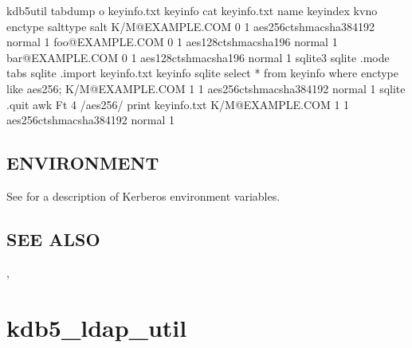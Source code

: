 \documentclass[letterpaper,10pt,english]{sphinxmanual}
\begin{document}
\begin{sphinxVerbatim}[commandchars=\\\{\}]
\PYGZdl{} kdb5\PYGZus{}util tabdump \PYGZhy{}o keyinfo.txt keyinfo
\PYGZdl{} cat keyinfo.txt
name        keyindex        kvno    enctype salttype        salt
K/M@EXAMPLE.COM     0       1       aes256\PYGZhy{}cts\PYGZhy{}hmac\PYGZhy{}sha384\PYGZhy{}192      normal  \PYGZhy{}1
foo@EXAMPLE.COM     0       1       aes128\PYGZhy{}cts\PYGZhy{}hmac\PYGZhy{}sha1\PYGZhy{}96 normal  \PYGZhy{}1
bar@EXAMPLE.COM     0       1       aes128\PYGZhy{}cts\PYGZhy{}hmac\PYGZhy{}sha1\PYGZhy{}96 normal  \PYGZhy{}1
\PYGZdl{} sqlite3
sqlite\PYGZgt{} .mode tabs
sqlite\PYGZgt{} .import keyinfo.txt keyinfo
sqlite\PYGZgt{} select * from keyinfo where enctype like \PYGZsq{}aes256\PYGZhy{}\PYGZpc{}\PYGZsq{};
K/M@EXAMPLE.COM     1       1       aes256\PYGZhy{}cts\PYGZhy{}hmac\PYGZhy{}sha384\PYGZhy{}192      normal  \PYGZhy{}1
sqlite\PYGZgt{} .quit
\PYGZdl{} awk \PYGZhy{}F\PYGZsq{}\PYGZbs{}t\PYGZsq{} \PYGZsq{}\PYGZdl{}4 \PYGZti{} /aes256\PYGZhy{}/ \PYGZob{} print \PYGZcb{}\PYGZsq{} keyinfo.txt
K/M@EXAMPLE.COM     1       1       aes256\PYGZhy{}cts\PYGZhy{}hmac\PYGZhy{}sha384\PYGZhy{}192      normal  \PYGZhy{}1
\end{sphinxVerbatim}


\subsection{ENVIRONMENT}
\label{\detokenize{admin/admin_commands/kdb5_util:environment}}
\sphinxAtStartPar
See  for a description of Kerberos environment
variables.


\subsection{SEE ALSO}
\label{\detokenize{admin/admin_commands/kdb5_util:see-also}}
\sphinxAtStartPar
{\hyperref[\detokenize{admin/admin_commands/kadmin_local:kadmin-1}]{}}, 


\section{kdb5\_ldap\_util}
\label{\detokenize{admin/admin_commands/kdb5_ldap_util:kdb5-ldap-util}}\label{\detokenize{admin/admin_commands/kdb5_ldap_util:kdb5-ldap-util-8}}\label{\detokenize{admin/admin_commands/kdb5_ldap_util::doc}}
\end{document}
